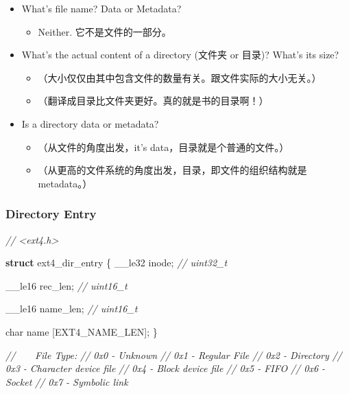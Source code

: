 \documentclass[
]{article}
\newenvironment{Shaded}{}{}
\newcommand{\CommentTok}[1]{\textcolor[rgb]{0.38,0.63,0.69}{\textit{#1}}}
\newcommand{\DataTypeTok}[1]{\textcolor[rgb]{0.56,0.13,0.00}{#1}}
\newcommand{\KeywordTok}[1]{\textcolor[rgb]{0.00,0.44,0.13}{\textbf{#1}}}
\newcommand{\NormalTok}[1]{#1}
\begin{document}
\begin{itemize}
\item
  What's file name? Data or Metadata?

  \begin{itemize}
  \item
    Neither. 它不是文件的一部分。
  \end{itemize}
\item
  What's the actual content of a directory (文件夹 or 目录)? What's its
  size?

  \begin{itemize}
  \item
    （大小仅仅由其中包含文件的数量有关。跟文件实际的大小无关。）
  \item
    （翻译成目录比文件夹更好。真的就是书的目录啊！）
  \end{itemize}
\item
  Is a directory data or metadata?

  \begin{itemize}
  \item
    （从文件的角度出发，it's data，目录就是个普通的文件。）
  \item
    （从更高的文件系统的角度出发，目录，即文件的组织结构就是
    metadata。）
  \end{itemize}
\end{itemize}

\hypertarget{header-n153}{%
\subsubsection{Directory Entry}\label{header-n153}}

\begin{Shaded}
\begin{Highlighting}[]
\CommentTok{// <ext4.h>}

\KeywordTok{struct}\NormalTok{ ext4_dir_entry \{}
\NormalTok{    __le32 	inode;}
    \CommentTok{// uint32_t}
    
\NormalTok{    __le16 	rec_len;}
    \CommentTok{// uint16_t}
    
\NormalTok{    __le16 	name_len;}
    \CommentTok{// uint16_t}
    
    \DataTypeTok{char}\NormalTok{ 	name [EXT4_NAME_LEN];}
\NormalTok{\}}


\CommentTok{//    File Type:}
\CommentTok{//    0x0 - Unknown}
\CommentTok{//    0x1 - Regular File}
\CommentTok{//    0x2 - Directory}
\CommentTok{//    0x3 - Character device file}
\CommentTok{//    0x4 - Block device file}
\CommentTok{//    0x5 - FIFO}
\CommentTok{//    0x6 - Socket}
\CommentTok{//    0x7 - Symbolic link}
\end{Highlighting}
\end{Shaded}
\end{document}
